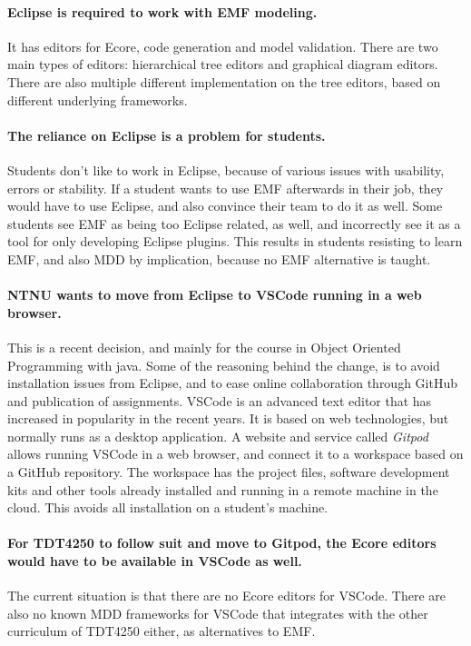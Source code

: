 \paragraph{\Gls{Eclipse} is required to work with \acrshort{EMF} modeling.}
It has editors for \gls{Ecore}, code generation and model validation.
There are two main types of editors: hierarchical tree editors and graphical diagram editors.
There are also multiple different implementation on the tree editors, based on different underlying frameworks.

\paragraph{The reliance on \gls{Eclipse} is a problem for students.}
Students don't like to work in Eclipse, because of various issues with usability, errors or stability. %
If a student wants to use \acrshort{EMF} afterwards in their job, they would have to use \gls{Eclipse}, and also convince their team to do it as well.
Some students see \acrshort{EMF} as being too \gls{Eclipse} related, as well, and incorrectly see it as a tool for only developing Eclipse plugins.
This results in students resisting to learn \acrshort{EMF}, and also \acrshort{MDD} by implication, because no \acrshort{EMF} alternative is taught.

\paragraph{\acrshort{NTNU} wants to move from \gls{Eclipse} to \gls{VSCode} running in a web browser.}
This is a recent decision, and mainly for the course in Object Oriented Programming with java.
Some of the reasoning behind the change, is to avoid installation issues from \gls{Eclipse}, and to ease online collaboration through GitHub and publication of assignments. %
\gls{VSCode} is an advanced text editor that has increased in popularity in the recent years.
It is based on web technologies, but normally runs as a desktop application.
A website and service called \textit{\gls{Gitpod}} allows running \gls{VSCode} in a web browser, and connect it to a workspace based on a GitHub repository.
The workspace has the project files, software development kits and other tools already installed and running in a remote machine in the \gls{cloud}.
This avoids all installation on a student's machine.

\paragraph{For \gls{TDT4250} to follow suit and move to \gls{Gitpod}, the \gls{Ecore} editors would have to be available in \gls{VSCode} as well.}
The current situation is that there are no \gls{Ecore} editors for \gls{VSCode}.
There are also no known \acrshort{MDD} frameworks for \gls{VSCode} that integrates with the other curriculum of \gls{TDT4250} either, as alternatives to \acrshort{EMF}.


